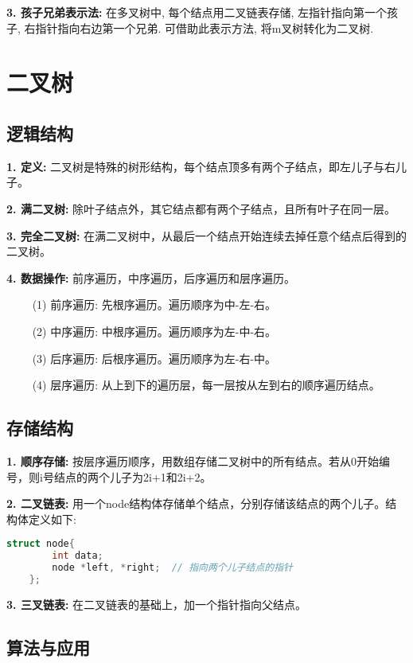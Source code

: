 \textbf{3. 孩子兄弟表示法:} 在多叉树中, 每个结点用二叉链表存储, 左指针指向第一个孩子, 右指针指向右边第一个兄弟. 可借助此表示方法, 将m叉树转化为二叉树.

\section{二叉树}

\subsection{逻辑结构}

\textbf{1. 定义: }二叉树是特殊的树形结构，每个结点顶多有两个子结点，即左儿子与右儿子。

\textbf{2. 满二叉树: }除叶子结点外，其它结点都有两个子结点，且所有叶子在同一层。

\textbf{3. 完全二叉树: }在满二叉树中，从最后一个结点开始连续去掉任意个结点后得到的二叉树。

\textbf{4. 数据操作: }前序遍历，中序遍历，后序遍历和层序遍历。

~~~~ (1) 前序遍历: 先根序遍历。遍历顺序为中-左-右。

~~~~ (2) 中序遍历: 中根序遍历。遍历顺序为左-中-右。

~~~~ (3) 后序遍历: 后根序遍历。遍历顺序为左-右-中。

~~~~ (4) 层序遍历: 从上到下的遍历层，每一层按从左到右的顺序遍历结点。

\subsection{存储结构}

\textbf{1. 顺序存储: }按层序遍历顺序，用数组存储二叉树中的所有结点。若从0开始编号，则i号结点的两个儿子为2i+1和2i+2。

\textbf{2. 二叉链表: }用一个node结构体存储单个结点，分别存储该结点的两个儿子。结构体定义如下: 

\begin{lstlisting}[language=C++]
    struct node{
        int data; 
        node *left, *right;  // 指向两个儿子结点的指针
    }; 
\end{lstlisting}

\textbf{3. 三叉链表: }在二叉链表的基础上，加一个指针指向父结点。

\subsection{算法与应用}

